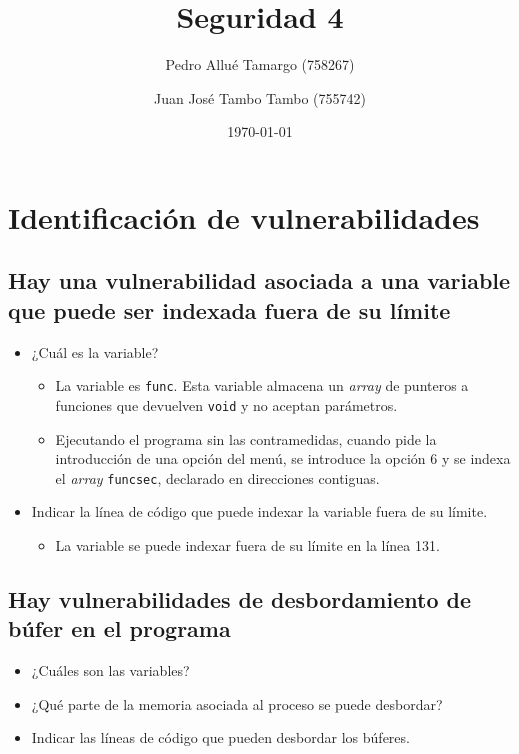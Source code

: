 \documentclass[10pt,a4paper]{article}
\begin{document}
\begin{titlepage}
\title{\textbf{Seguridad 4}}
\author{
	Pedro Allué Tamargo (758267)
	\and
	Juan José Tambo Tambo (755742)
}
\date{\today}
\clearpage\maketitle
\thispagestyle{empty}
\tableofcontents
\end{titlepage}

\section{Identificación de vulnerabilidades}

\subsection{Hay una vulnerabilidad asociada a una variable que puede ser indexada fuera de su límite}
\begin{itemize}
\item ¿Cuál es la variable?
	\begin{itemize}
	\item La variable es \texttt{func}. Esta variable almacena un \emph{array} de punteros a funciones que devuelven \texttt{void} y no aceptan parámetros.
	\item Ejecutando el programa sin las contramedidas, cuando pide la introducción de una opción del menú, se introduce la opción 6 y se indexa el \emph{array} \texttt{funcsec}, declarado en direcciones contiguas.
	\end{itemize}
\item Indicar la línea de código que puede indexar la variable fuera de su límite.
	\begin{itemize}
	\item La variable se puede indexar fuera de su límite en la línea 131.
	\end{itemize}
\end{itemize}

\subsection{Hay vulnerabilidades de desbordamiento de búfer en el programa}
\begin{itemize}
\item ¿Cuáles son las variables?
\item ¿Qué parte de la memoria asociada al proceso se puede desbordar?
\item Indicar las líneas de código que pueden desbordar los búferes.
\end{itemize}
\end{document}

